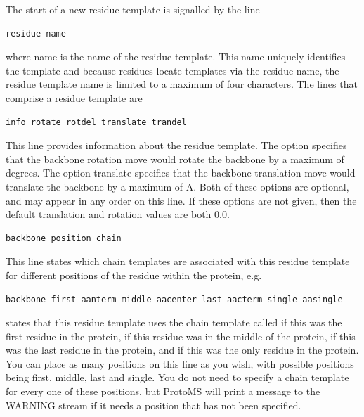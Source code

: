 \documentclass[letterpaper,10pt,english]{sphinxmanual}
\begin{document}
The start of a new residue template is signalled by the line

\begin{Verbatim}[commandchars=\\\{\}]
residue name
\end{Verbatim}

where name is the name of the residue template. This name uniquely identifies the template and because residues locate templates via the residue name, the residue template name is limited to a maximum of four characters. The lines that comprise a residue template are

\begin{Verbatim}[commandchars=\\\{\}]
info rotate rotdel translate trandel
\end{Verbatim}

This line provides information about the residue template. The option   specifies that the backbone rotation move would rotate the backbone by a maximum of  degrees. The option translate  specifies that the backbone translation move would translate the backbone by a maximum of  A. Both of these options are optional, and may appear in any order on this line. If these options are not given, then the default translation and rotation values are both 0.0.

\begin{Verbatim}[commandchars=\\\{\}]
backbone position chain
\end{Verbatim}

This line states which chain templates are associated with this residue template for different positions of the residue within the protein, e.g.

\begin{Verbatim}[commandchars=\\\{\}]
backbone first aanterm middle aacenter last aacterm single aasingle
\end{Verbatim}

states that this residue template uses the chain template called  if this was the first residue in the protein,  if this residue was in the middle of the protein,  if this was the last residue in the protein, and  if this was the only residue in the protein. You can place as many positions on this line as you wish, with possible positions being first, middle, last and single. You do not need to specify a chain template for every one of these positions, but ProtoMS will print a message to the WARNING stream if it needs a position that has not been specified.
\end{document}
